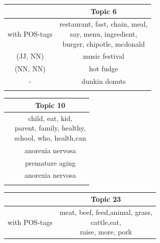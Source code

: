 {%




\begin{table}
	\begin{minipage}[t]{0.5\textwidth}
		\begin{tabular}{c|c}
			&Topic 6\\
			\hline
			\hline
			with \ac{POS}-tags & \thead{restaurant, fast, chain, meal,\\ say, menu, ingredient,\\ burger, chipotle, mcdonald } \\
			\hline
			(JJ, NN) & music festival   \\
			(NN, NN) & hot fudge \\
			-  & dunkin donuts\\
			&
		\end{tabular}
	\end{minipage}
	\begin{minipage}[t]{0.5\textwidth}
		\begin{tabular}{c|c}
			&Topic 10\\
			\hline
			\hline
			& \thead{child, eat, kid,\\ parent, family,	healthy,\\ school, who, 	health,can } \\
			\hline
			& anorexia nervosa \\
			& premature aging   \\
			& anorexia nervosa	\\
			&
		\end{tabular}
	\end{minipage}
	\begin{minipage}[t]{0.5\textwidth}
		\begin{tabular}{c|c}
			&Topic 23\\
			\hline
			\hline
			with \ac{POS}-tags &  \thead{meat, beef, feed,animal, grass,\\ cattle,eat,\\ raise, more, pork} \\

\end{tabular}
\end{minipage}
\end{table}}

